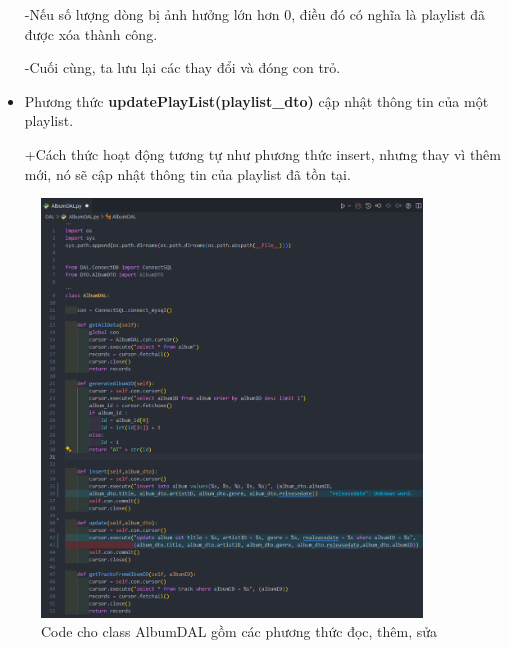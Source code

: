 \documentclass[a4paper]{article}
\begin{document}
\begin{flushleft}
\begin{itemize}
\begin{flushleft}
			      -Nếu số lượng dòng bị ảnh hưởng lớn hơn 0, điều đó có nghĩa là playlist đã được xóa thành công.

			      -Cuối cùng, ta lưu lại các thay đổi và đóng con trỏ.
		      \end{flushleft}
		\item Phương thức \textbf{updatePlayList(playlist\_dto)} cập nhật thông tin của một playlist.
		      \begin{flushleft}
			      +Cách thức hoạt động tương tự như phương thức insert, nhưng thay vì thêm mới, nó sẽ cập nhật thông tin của playlist đã tồn tại.
		      \end{flushleft}
	\end{itemize}
\end{flushleft}

\clearpage
\newpage
\begin{figure}[h]
	\centering
	\includegraphics[width=0.9\textwidth]{images/albumDAL.png}
	\caption{Code cho class AlbumDAL gồm các phương thức đọc, thêm, sửa}
\end{figure}
\end{document}
